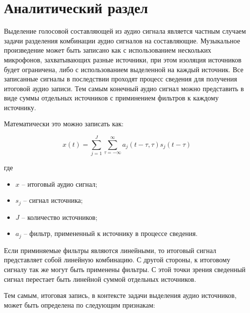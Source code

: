\chapter{Аналитический раздел}
\label{cha:analysis}

Выделение голосовой составляющей из аудио сигнала является частным случаем задачи разделения комбинации аудио сигналов на составляющие. Музыкальное произведение может быть записано как с использованием нескольких микрофонов, захватывающих разные источники, при этом изоляция источников будет ограничена, либо с использованием выделенной на каждый источник. Все записанные сигналы в последствии проходят процесс сведения для получения итоговой аудио записи. Тем самым конечный аудио сигнал можно представить в виде суммы отдельных источников с приминением фильтров к каждому источнику.

Математически это можно записать как:

\begin{equation}
 x(t) = \sum_{j=1}^{J} \sum_{\tau=-\infty}^{\infty} a_{j}(t-\tau, \tau)s_j(t-\tau)
 \label{anal:result-signal}
\end{equation}

где 

\begin{itemize}
	\item $x$ -- итоговый аудио сигнал;
	\item $s_j$ -- сигнал источника;
	\item $J$ -- количество источников;
	\item $a_j$ -- фильтр, примененный к источнику в процессе сведения.
\end{itemize}

Если приминяемые фильтры являются линейными, то итоговый сигнал представляет собой линейную комбинацию. С другой стороны, к итоговому сигналу так же могут быть применены фильтры. С этой точки зрения сведенный сигнал перестает быть линейной суммой отдельных источников. 

Тем самым, итоговая запись, в контексте задачи выделения аудио источников, может быть определена по следующим признакам\cite{[Chandna}:

